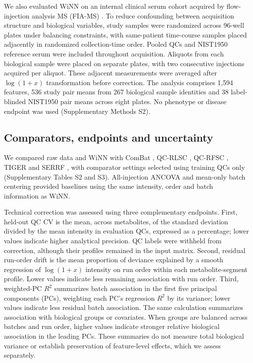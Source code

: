 \documentclass[namedate,webpdf,modern,large,nocrop]{oup-authoring-template}
\begin{document}
We also evaluated WiNN on an internal clinical serum cohort acquired by flow-injection analysis MS (FIA-MS) \citep{Fuhrer2011FIATOF}. To reduce confounding between acquisition structure and biological variables, study samples were randomized across 96-well plates under balancing constraints, with same-patient time-course samples placed adjacently in randomized collection-time order. Pooled QCs and NIST1950 reference serum were included throughout acquisition. Aliquots from each biological sample were placed on separate plates, with two consecutive injections acquired per aliquot. These adjacent measurements were averaged after $\log(1+x)$ transformation before correction. The analysis comprises 1,594 features, 536 study pair means from 267 biological sample identities and 38 label-blinded NIST1950 pair means across eight plates. No phenotype or disease endpoint was used (Supplementary Methods S2).

\subsection{Comparators, endpoints and uncertainty}

We compared raw data and WiNN with ComBat \citep{Johnson2007ComBat}, QC-RLSC \citep{Dunn2011}, QC-RFSC \citep{Luan2018StatTarget}, TIGER \citep{Han2022TIGER} and SERRF \citep{Fan2019SERRF}, with comparator settings selected using training QCs only (Supplementary Tables S2 and S3). All-injection ANCOVA \citep{Wehrens2016BatchCorr} and mean-only batch centering provided baselines using the same intensity, order and batch information as WiNN.

Technical correction was assessed using three complementary endpoints. First, held-out QC CV is the mean, across metabolites, of the standard deviation divided by the mean intensity in evaluation QCs, expressed as a percentage; lower values indicate higher analytical precision. QC labels were withheld from correction, although their profiles remained in the input matrix. Second, residual run-order drift is the mean proportion of deviance explained by a smooth regression of $\log(1+x)$ intensity on run order within each metabolite-segment profile. Lower values indicate less remaining association with run order. Third, weighted-PC $R^2$ summarizes batch association in the first five principal components (PCs), weighting each PC's regression $R^2$ by its variance; lower values indicate less residual batch association. The same calculation summarizes association with biological groups or covariates. When groups are balanced across batches and run order, higher values indicate stronger relative biological association in the leading PCs. These summaries do not measure total biological variance or establish preservation of feature-level effects, which we assess separately.
\end{document}

